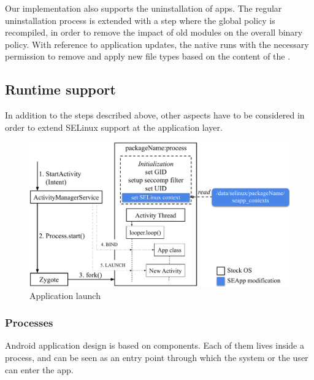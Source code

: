 Our implementation also supports the uninstallation of \seapp apps.  The
regular uninstallation process is extended with a step where the
global policy is recompiled, in order to remove the impact of old
modules on the overall binary policy.  With reference to application
updates, the native \installd runs with the necessary permission to
remove and apply new file types based on the content of the
\filecontexts.

\subsection{Runtime support}\label{sect:seapp_app_runtime}

In addition to the steps described above, other aspects have to be
considered in order to extend SELinux support at the application
layer.

\begin{figure}[h]
  \centering
  \includegraphics[width=0.8\columnwidth]{chapters/seapp/figs/app_launch}
  \caption{\label{fig:seapp_runtime} Application launch}
\end{figure}

\subsubsection{Processes}

Android application design is based on components.  Each of them lives
inside a process, and can be seen as an entry point through which the
system or the user can enter the app.

